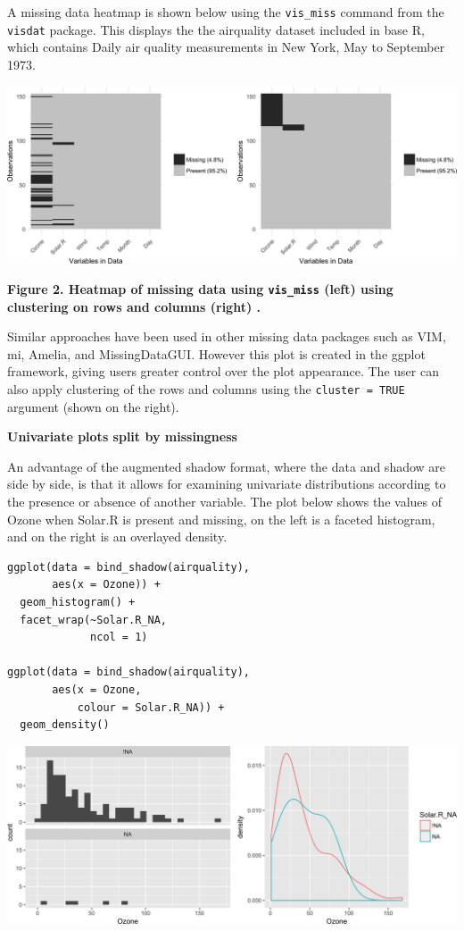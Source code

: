 \documentclass[]{article}
\begin{document}
A missing data heatmap is shown below using the \texttt{vis\_miss}
command from the \texttt{visdat} package. This displays the the
airquality dataset included in base R, which contains Daily air quality
measurements in New York, May to September 1973.

\includegraphics{jsm2017_files/figure-latex/unnamed-chunk-1-1.png}

\textbf{Figure 2. Heatmap of missing data using \texttt{vis\_miss}
(left) using clustering on rows and columns (right) .}

Similar approaches have been used in other missing data packages such as
VIM, mi, Amelia, and MissingDataGUI. However this plot is created in the
ggplot framework, giving users greater control over the plot appearance.
The user can also apply clustering of the rows and columns using the
\texttt{cluster\ =\ TRUE} argument (shown on the right).

\textbf{Univariate plots split by missingness}

An advantage of the augmented shadow format, where the data and shadow
are side by side, is that it allows for examining univariate
distributions according to the presence or absence of another variable.
The plot below shows the values of Ozone when Solar.R is present and
missing, on the left is a faceted histogram, and on the right is an
overlayed density.

\begin{verbatim}
ggplot(data = bind_shadow(airquality),
       aes(x = Ozone)) + 
  geom_histogram() + 
  facet_wrap(~Solar.R_NA,
             ncol = 1)

ggplot(data = bind_shadow(airquality),
       aes(x = Ozone,
           colour = Solar.R_NA)) + 
  geom_density()
\end{verbatim}

\includegraphics{jsm2017_files/figure-latex/bind-shadow-density-1.png}
\end{document}
